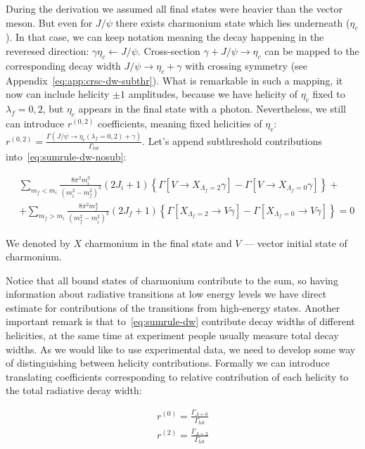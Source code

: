 During the derivation we assumed all final states were heavier than the vector meson. But even for $J/\psi$ there exists charmonium state which lies underneath ($\eta_c$). In that case, we can keep notation meaning the decay happening in the reveresed direction: $\gamma \eta_c \leftarrow J/\psi$. Cross-section $\gamma + J/\psi \rightarrow \eta_c$ can be mapped to the corresponding decay width $J/\psi \rightarrow \eta_c + \gamma$ with crossing symmetry (see Appendix~\cref{eq:app:crsc-dw-subthr}). What is remarkable in such a mapping, it now can include helicity $\pm1$ amplitudes, because we have helicity of $\eta_c$ fixed to $\lambda_f = 0, 2$, but $\eta_c$ appears in the final state with a photon. Nevertheless, we still can introduce $r^{(0,2)}$ coefficients, meaning fixed helicities of $\eta_c$: $r^{(0,2)} = \frac{\Gamma(J/\psi \rightarrow \eta_c(\lambda_f = 0, 2) + \gamma)}{\Gamma_{tot}}$. Let's append subthreshold contributions into~\cref{eq:sumrule-dw-nosub}:

\begin{align} \label{eq:sumrule-dw}
    &\sum_{m_f < m_i} \frac{8 \pi^2 m_i^3}{(m_i^2 - m_f^2)^3} (2J_i+1) \left\{\Gamma\left[V \rightarrow X_{\Lambda_f = 2} \gamma\right] - \Gamma\left[V \rightarrow X_{\Lambda_f = 0} \gamma\right] \right\} + \nonumber \\
    &+ \sum_{m_f > m_i} \frac{8 \pi^2 m_f^3}{(m_f^2 - m_i^2)^3} (2J_f+1) \left\{\Gamma\left[X_{\Lambda_f=2} \rightarrow V \gamma \right] - \Gamma\left[X_{\Lambda_f = 0} \rightarrow V\gamma \right] \right\} = 0
\end{align}

We denoted by $X$ charmonium in the final state and $V$ --- vector initial state of charmonium.

Notice that all bound states of charmonium contribute to the sum, so having information about radiative transitions at low energy levels we have direct estimate for contributions of the transitions from high-energy states. Another important remark is that to~\ref{eq:sumrule-dw} contribute decay widths of different helicities, at the same time at experiment people usually measure total decay widths. As we would like to use experimental data, we need to develop some way of distinguishing between helicity contributions. Formally we can introduce translating coefficients corresponding to relative contribution of each helicity to the total radiative decay width:

\begin{align}
    r^{(0)} = \frac{\Gamma_{\Lambda=0}}{\Gamma_{tot}} \\
    r^{(2)} = \frac{\Gamma_{\Lambda=2}}{\Gamma_{tot}}
\end{align}

